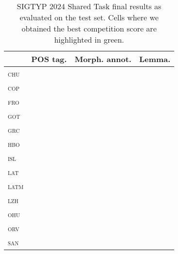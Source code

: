 \documentclass{../acl_latex.tex}
\begin{document}
\begin{table}[t]
\centering
\begin{tabular}{lrrr}
\toprule
                 & POS tag. & Morph. annot. & Lemma. \\ \midrule
\textsc{chu}     & \cellcolor{green!25}         &               &        \\ 
\textsc{cop}     &          &               &        \\ 
\textsc{fro}     &          &               &        \\
\textsc{got}     &          &               &        \\
\textsc{grc}     &          &               &        \\
\textsc{hbo}     &          &               &        \\
\textsc{isl}     &          &               &        \\
\textsc{lat}     &          &               &        \\
\textsc{latm}    &          &               &        \\
\textsc{lzh}     &          &               &        \\
\textsc{ohu}     &          &               &        \\
\textsc{orv}     &          &               &        \\
\textsc{san}     &          &               &        \\ \bottomrule 
\end{tabular}
\caption{
    SIGTYP 2024 Shared Task final results as evaluated on the test set.
    Cells where we obtained the best competition score are highlighted in \colorbox{green!25}{green}.
}
\label{table:main_results}
\end{table}
\end{document}
